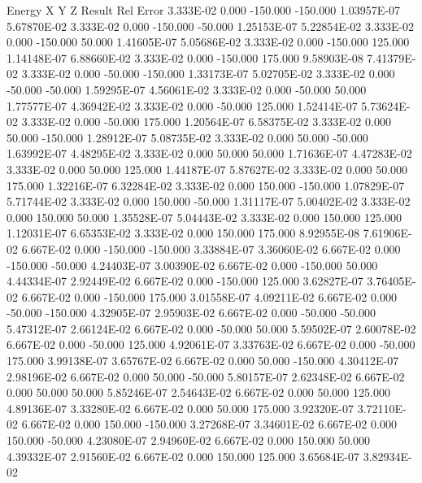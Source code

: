    Energy         X         Y         Z     Result     Rel Error
  3.333E-02     0.000  -150.000  -150.000 1.03957E-07 5.67870E-02
  3.333E-02     0.000  -150.000   -50.000 1.25153E-07 5.22854E-02
  3.333E-02     0.000  -150.000    50.000 1.41605E-07 5.05686E-02
  3.333E-02     0.000  -150.000   125.000 1.14148E-07 6.88660E-02
  3.333E-02     0.000  -150.000   175.000 9.58903E-08 7.41379E-02
  3.333E-02     0.000   -50.000  -150.000 1.33173E-07 5.02705E-02
  3.333E-02     0.000   -50.000   -50.000 1.59295E-07 4.56061E-02
  3.333E-02     0.000   -50.000    50.000 1.77577E-07 4.36942E-02
  3.333E-02     0.000   -50.000   125.000 1.52414E-07 5.73624E-02
  3.333E-02     0.000   -50.000   175.000 1.20564E-07 6.58375E-02
  3.333E-02     0.000    50.000  -150.000 1.28912E-07 5.08735E-02
  3.333E-02     0.000    50.000   -50.000 1.63992E-07 4.48295E-02
  3.333E-02     0.000    50.000    50.000 1.71636E-07 4.47283E-02
  3.333E-02     0.000    50.000   125.000 1.44187E-07 5.87627E-02
  3.333E-02     0.000    50.000   175.000 1.32216E-07 6.32284E-02
  3.333E-02     0.000   150.000  -150.000 1.07829E-07 5.71744E-02
  3.333E-02     0.000   150.000   -50.000 1.31117E-07 5.00402E-02
  3.333E-02     0.000   150.000    50.000 1.35528E-07 5.04443E-02
  3.333E-02     0.000   150.000   125.000 1.12031E-07 6.65353E-02
  3.333E-02     0.000   150.000   175.000 8.92955E-08 7.61906E-02
  6.667E-02     0.000  -150.000  -150.000 3.33884E-07 3.36060E-02
  6.667E-02     0.000  -150.000   -50.000 4.24403E-07 3.00390E-02
  6.667E-02     0.000  -150.000    50.000 4.44334E-07 2.92449E-02
  6.667E-02     0.000  -150.000   125.000 3.62827E-07 3.76405E-02
  6.667E-02     0.000  -150.000   175.000 3.01558E-07 4.09211E-02
  6.667E-02     0.000   -50.000  -150.000 4.32905E-07 2.95903E-02
  6.667E-02     0.000   -50.000   -50.000 5.47312E-07 2.66124E-02
  6.667E-02     0.000   -50.000    50.000 5.59502E-07 2.60078E-02
  6.667E-02     0.000   -50.000   125.000 4.92061E-07 3.33763E-02
  6.667E-02     0.000   -50.000   175.000 3.99138E-07 3.65767E-02
  6.667E-02     0.000    50.000  -150.000 4.30412E-07 2.98196E-02
  6.667E-02     0.000    50.000   -50.000 5.80157E-07 2.62348E-02
  6.667E-02     0.000    50.000    50.000 5.85246E-07 2.54643E-02
  6.667E-02     0.000    50.000   125.000 4.89136E-07 3.33280E-02
  6.667E-02     0.000    50.000   175.000 3.92320E-07 3.72110E-02
  6.667E-02     0.000   150.000  -150.000 3.27268E-07 3.34601E-02
  6.667E-02     0.000   150.000   -50.000 4.23080E-07 2.94960E-02
  6.667E-02     0.000   150.000    50.000 4.39332E-07 2.91560E-02
  6.667E-02     0.000   150.000   125.000 3.65684E-07 3.82934E-02
